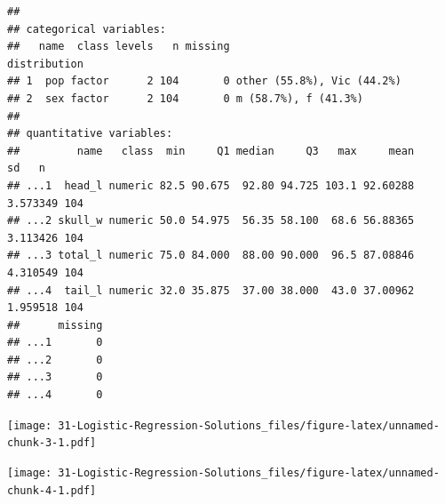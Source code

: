 \documentclass[
]{book}
\newenvironment{Shaded}{\begin{snugshade}}{\end{snugshade}}
\newcommand{\DataTypeTok}[1]{\textcolor[rgb]{0.13,0.29,0.53}{#1}}
\newcommand{\KeywordTok}[1]{\textcolor[rgb]{0.13,0.29,0.53}{\textbf{#1}}}
\newcommand{\NormalTok}[1]{#1}
\newcommand{\OperatorTok}[1]{\textcolor[rgb]{0.81,0.36,0.00}{\textbf{#1}}}
\newcommand{\StringTok}[1]{\textcolor[rgb]{0.31,0.60,0.02}{#1}}
\begin{document}
\begin{verbatim}
## 
## categorical variables:  
##   name  class levels   n missing                                  distribution
## 1  pop factor      2 104       0 other (55.8%), Vic (44.2%)                   
## 2  sex factor      2 104       0 m (58.7%), f (41.3%)                         
## 
## quantitative variables:  
##         name   class  min     Q1 median     Q3   max     mean       sd   n
## ...1  head_l numeric 82.5 90.675  92.80 94.725 103.1 92.60288 3.573349 104
## ...2 skull_w numeric 50.0 54.975  56.35 58.100  68.6 56.88365 3.113426 104
## ...3 total_l numeric 75.0 84.000  88.00 90.000  96.5 87.08846 4.310549 104
## ...4  tail_l numeric 32.0 35.875  37.00 38.000  43.0 37.00962 1.959518 104
##      missing
## ...1       0
## ...2       0
## ...3       0
## ...4       0
\end{verbatim}

\begin{Shaded}
\end{Shaded}

\texttt{[image: 31-Logistic-Regression-Solutions\_files/figure-latex/unnamed-chunk-3-1.pdf]}

\begin{Shaded}
\end{Shaded}

\texttt{[image: 31-Logistic-Regression-Solutions\_files/figure-latex/unnamed-chunk-4-1.pdf]}
\end{document}
